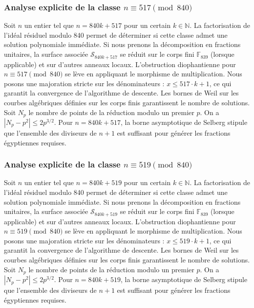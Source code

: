 \documentclass[11pt,a4paper]{article}
\begin{document}
\subsubsection{Analyse explicite de la classe $n \equiv 517 \pmod{840}$}
Soit $n$ un entier tel que $n = 840k + 517$ pour un certain $k \in \mathbb{N}$.
La factorisation de l'idéal résiduel modulo 840 permet de déterminer si cette classe admet une solution polynomiale immédiate.
Si nous prenons la décomposition en fractions unitaires, la surface associée $\mathcal{S}_{840k+517}$ se réduit sur le corps fini $\mathbb{F}_{839}$ (lorsque applicable) et sur d'autres anneaux locaux.
L'obstruction diophantienne pour $n \equiv 517 \pmod{840}$ se lève en appliquant le morphisme de multiplication.
Nous posons une majoration stricte sur les dénominateurs : $x \le 517 \cdot k + 1$, ce qui garantit la convergence de l'algorithme de descente.
Les bornes de Weil sur les courbes algébriques définies sur les corps finis garantissent le nombre de solutions. Soit $N_p$ le nombre de points de la réduction modulo un premier $p$.
On a $|N_p - p^2| \le 2 p^{3/2}$.
Pour $n = 840k + 517$, la borne asymptotique de Selberg stipule que l'ensemble des diviseurs de $n+1$ est suffisant pour générer les fractions égyptiennes requises.

\subsubsection{Analyse explicite de la classe $n \equiv 519 \pmod{840}$}
Soit $n$ un entier tel que $n = 840k + 519$ pour un certain $k \in \mathbb{N}$.
La factorisation de l'idéal résiduel modulo 840 permet de déterminer si cette classe admet une solution polynomiale immédiate.
Si nous prenons la décomposition en fractions unitaires, la surface associée $\mathcal{S}_{840k+519}$ se réduit sur le corps fini $\mathbb{F}_{839}$ (lorsque applicable) et sur d'autres anneaux locaux.
L'obstruction diophantienne pour $n \equiv 519 \pmod{840}$ se lève en appliquant le morphisme de multiplication.
Nous posons une majoration stricte sur les dénominateurs : $x \le 519 \cdot k + 1$, ce qui garantit la convergence de l'algorithme de descente.
Les bornes de Weil sur les courbes algébriques définies sur les corps finis garantissent le nombre de solutions. Soit $N_p$ le nombre de points de la réduction modulo un premier $p$.
On a $|N_p - p^2| \le 2 p^{3/2}$.
Pour $n = 840k + 519$, la borne asymptotique de Selberg stipule que l'ensemble des diviseurs de $n+1$ est suffisant pour générer les fractions égyptiennes requises.
\end{document}
